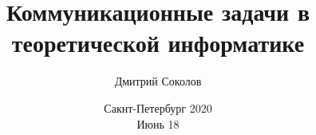 

\titlegraphic{
    
}


\title[Коммуникационные проблемы]{
    Коммуникационные задачи в теоретической информатике
}

\author[Соколов Д.]{
    Дмитрий Соколов
}  


\date{Сакнт-Петербург 2020\\ Июнь 18}




    \maketitle

    
    
    

